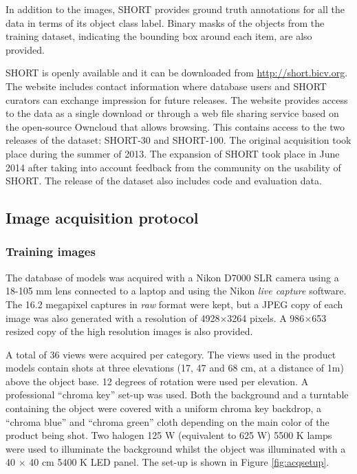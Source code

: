 In addition to the images, SHORT provides ground truth annotations for all the data in terms of its object class label. Binary masks of the objects from the training dataset, indicating the bounding box around each item, are also provided.

SHORT is openly available and it can be downloaded from \url{http://short.bicv.org}. The website  includes contact information where database users and SHORT curators can exchange impression for future releases. The website provides access to the data as a single download or through a web file sharing service based on the open-source Owncloud that allows browsing. This contains access to the two releases of the dataset: SHORT-30 and SHORT-100. The original acquisition took place during the summer of 2013. The expansion of SHORT took place in June 2014 after taking into account feedback from the community on the usability of SHORT. The release of the dataset also includes code and evaluation data.

\subsection{Image acquisition protocol}

\subsubsection{Training images}

The database of models was acquired with a Nikon D7000 SLR camera using a 18-105 mm lens connected to a laptop and using the Nikon \textit{live capture} software. The 16.2 megapixel captures in \textit{raw} format were kept, but a JPEG copy of each image was also generated with a resolution of 4928$\times$3264 pixels. A 986$\times$653 resized copy of the high resolution images is also provided.

A total of 36 views were acquired per category. The views used in the product models contain shots at three elevations (17, 47 and 68 cm, at a distance of 1m) above the object base. 12 degrees of rotation were used per elevation. A professional ``chroma key'' set-up was used. Both the background and a turntable containing the object were covered with a uniform chroma key backdrop, a ``chroma blue'' and ``chroma green'' cloth depending on the main color of the product being shot. Two halogen 125 W (equivalent to 625 W) 5500 K lamps were used to illuminate the background whilst the object was illuminated with a 40 $\times$ 40 cm 5400 K LED panel. The set-up is shown in Figure \ref{fig:acqsetup}.


